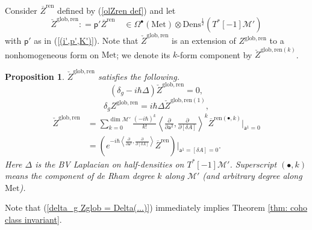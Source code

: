 \documentclass[11pt,a4paper]{amsart}
\theoremstyle{plain} %
\newtheorem{prop}[thm]{Proposition}
\theoremstyle{definition}
\theoremstyle{remark}
\newcommand{\mr}{\mathrm}
\newcommand{\sfa}{\mathsf{a}}
\newcommand{\bt}{\bullet}
\newcommand{\M}{\mathcal{M}}
\begin{document}
Consider $\overline{Z}^\mr{ren}$ defined by (\ref{olZren def}) 
and let 
\begin{equation}
    \check{Z}^\mr{glob,ren}\colon=\mathsf{p}' \overline{Z}^\mr{ren} 
    \quad \in \Omega^\bt(\mr{Met})\otimes\mr{Dens}^{\frac12}(T^*[-1]\M')
\end{equation}
with $\mathsf{p}'$ as in (\ref{(i',p',K')}). Note that $\check{Z}^\mr{glob,ren}$ is an extension of $Z^\mr{glob,ren}$ to a nonhomogeneous form on $\mr{Met}$; we denote its $k$-form component by $\check{Z}^{\mr{glob,ren}(k)}$. 

\begin{prop}\label{prop: properties of Zcheckglob}
$\check{Z}^\mr{glob,ren}$ satisfies the following. 
\begin{equation}\label{Zcheckglob killed by delta_g+Delta}
(\delta_g-i\hbar \Delta)\check{Z}^\mr{glob,ren}=0,
\end{equation}
\begin{equation}\label{delta_g Zglob = Delta(...)}
\delta_g Z^\mr{glob,ren} = i\hbar\Delta \check{Z}^{\mr{glob,ren}(1)},
\end{equation}
\begin{equation}\label{Zcheckglob formula}
\begin{aligned}
    \check{Z}^\mr{glob,ren} &= \sum_{k=0}^{\dim \M'}\frac{(-i\hbar)^k}{k!} \left\langle \frac{\partial}{\partial \sfa^2},\frac{\partial}{\partial [\delta A]} \right\rangle^k \overline{Z}^{\mr{ren}(\bt,k)}\Big|_{\sfa^1=0} \\
    &= \left(e^{-i\hbar \left\langle \frac{\partial}{\partial \sfa^2},\frac{\partial}{\partial [\delta A]} \right\rangle}\overline{Z}^\mr{ren}\right)\Big|_{\sfa^1=[\delta A]=0}.
\end{aligned}
\end{equation}
Here $\Delta$ is the BV Laplacian on half-densities on $T^*[-1]\M'$. Superscript $(\bt,k)$ means the component of de Rham degree $k$ along $\M'$ (and arbitrary degree along $\mr{Met}$).
\end{prop}
Note that (\ref{delta_g Zglob = Delta(...)}) immediately implies Theorem \ref{thm: coho class invariant}.
\end{document}
